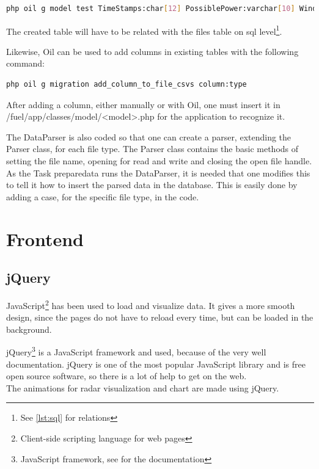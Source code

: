 \begin{lstlisting}[language=sh,caption={Oil command for creating model and migration},label={lst:oil_command}]
php oil g model test TimeStamps:char[12] PossiblePower:varchar[10] WindSpeed:varchar[10] RegimePossible:varchar[10] OutputPower:varchar[10] RegimeOutput:varchar[10] TimeStampsR:char[19] file_id:bigint --no-timestamp
\end{lstlisting}

The created table will have to be related with the \textsf{files} table on sql level\footnote{See \ref{lst:sql} for relations}.

Likewise, \textsf{Oil} can be used to add columns in existing tables with the following command:
\begin{lstlisting}[language=sh]
php oil g migration add_column_to_file_csvs column:type
\end{lstlisting}

After adding a column, either manually or with \textsf{Oil}, one must insert it in \textsf{/fuel/app/classes/model/<model>.php} for the application to recognize it.

The \textsf{DataParser} is also coded so that one can create a parser, extending the \textsf{Parser} class, for each file type. The \textsf{Parser} class contains the basic methods of setting the file name, opening for read and write and closing the open file handle. As the \textsf{Task preparedata} runs the \textsf{DataParser}, it is needed that one modifies this to tell it how to insert the parsed data in the database. This is easily done by adding a \textsf{case}, for the specific file type, in the code.

\section{Frontend}
\subsection{jQuery}
JavaScript\footnote{Client-side scripting language for web pages} has been used to load and visualize data. It gives a more smooth design, since the pages do not have to reload every time, but can be loaded in the background.

jQuery\footnote{JavaScript framework, see \cite{jquery} for the documentation} is a JavaScript framework and used, because of the very well documentation. jQuery is one of the most popular JavaScript library and is free open source software, so there is a lot of help to get on the web.\\
The animations for radar visualization and chart are made using jQuery.
 
